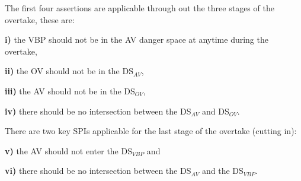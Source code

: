 The first four assertions are applicable through out the three stages of the overtake, these are:

\noindent \textbf{i)} the VBP should not be in the AV danger space at anytime during the overtake, 

\noindent \textbf{ii)} the OV should not be in the DS$_{AV}$, 

\noindent \textbf{iii)} the AV should not be in the DS$_{OV}$, 

\noindent \textbf{iv)} there should be no intersection between the DS$_{AV}$ and DS$_{OV}$.


There are two key SPIs applicable for the last stage of the overtake (cutting in):

\noindent \textbf{v)} the AV should not enter the DS$_{VBP}$ and 

\noindent \textbf{vi)} there should be no intersection between the DS$_{AV}$ and the DS$_{VBP}$. 


